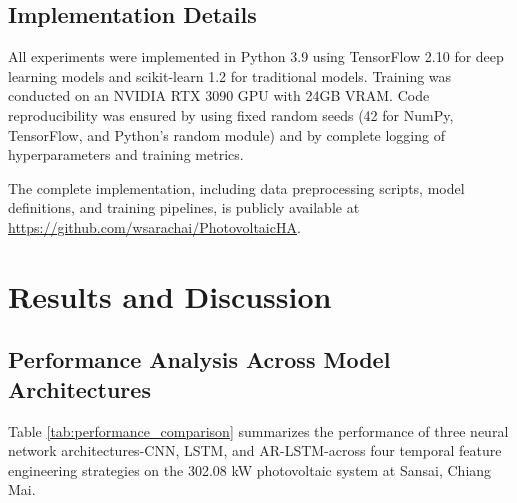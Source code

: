 \documentclass[conference]{IEEEtran}
\begin{document}
	\subsection{Implementation Details}
	All experiments were implemented in Python 3.9 using TensorFlow 2.10 for deep learning models and scikit-learn 1.2 for traditional models. Training was conducted on an NVIDIA RTX 3090 GPU with 24GB VRAM. Code reproducibility was ensured by using fixed random seeds (42 for NumPy, TensorFlow, and Python’s random module) and by complete logging of hyperparameters and training metrics.
	
	The complete implementation, including data preprocessing scripts, model definitions, and training pipelines, is publicly available at \url{https://github.com/wsarachai/PhotovoltaicHA}.
	
	
	\section{Results and Discussion}
	
	\subsection{Performance Analysis Across Model Architectures}
	Table \ref{tab:performance_comparison} summarizes the performance of three neural network architectures-CNN, LSTM, and AR-LSTM-across four temporal feature engineering strategies on the 302.08 kW photovoltaic system at Sansai, Chiang Mai.
	
\end{document}
